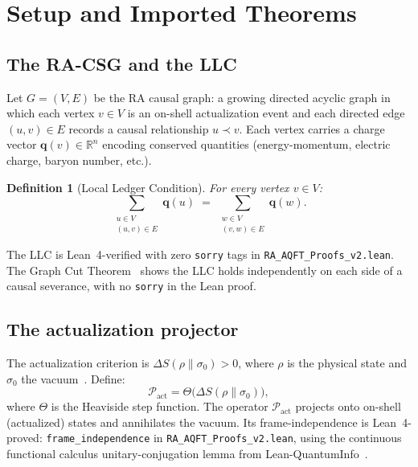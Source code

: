 \documentclass[11pt,a4paper]{article}
\newtheorem{definition}[theorem]{Definition}
\newcommand{\Pact}{\mathcal{P}_{\mathrm{act}}}
\newcommand{\dS}{\Delta S}
\begin{document}
\section{Setup and Imported Theorems}
\label{sec:setup}

\subsection{The RA-CSG and the LLC}

Let $G = (V, E)$ be the RA causal graph: a growing directed acyclic
graph in which each vertex $v \in V$ is an on-shell actualization
event and each directed edge $(u,v) \in E$ records a causal
relationship $u \prec v$. Each vertex carries a charge vector
$\mathbf{q}(v) \in \mathbb{R}^n$ encoding conserved quantities
(energy-momentum, electric charge, baryon number, etc.).

\begin{definition}[Local Ledger Condition]
\label{def:LLC}
For every vertex $v \in V$:
\begin{equation}
  \sum_{\substack{u \in V \\ (u,v)\in E}} \mathbf{q}(u)
  \;=\;
  \sum_{\substack{w \in V \\ (v,w)\in E}} \mathbf{q}(w).
\end{equation}
\end{definition}

\noindent
The LLC is Lean~4-verified with zero \texttt{sorry} tags in
\texttt{RA\_AQFT\_Proofs\_v2.lean}. The Graph Cut
Theorem~\citep{Sandeman2026RAGC} shows the LLC holds independently on
each side of a causal severance, with no \texttt{sorry} in the Lean
proof.

\subsection{The actualization projector}

The actualization criterion is $\dS(\rho\|\sigma_0) > 0$, where
$\rho$ is the physical state and $\sigma_0$ the vacuum~\citep{Sandeman2026RAQM}.
Define:
\begin{equation}
  \Pact = \Theta\!\bigl(\dS(\rho\|\sigma_0)\bigr),
\end{equation}
where $\Theta$ is the Heaviside step function. The operator $\Pact$
projects onto on-shell (actualized) states and annihilates the vacuum.
Its frame-independence is Lean~4-proved:
\texttt{frame\_independence} in \texttt{RA\_AQFT\_Proofs\_v2.lean},
using the continuous functional calculus unitary-conjugation lemma
from Lean-QuantumInfo~\citep{Meiburg2025LQI}.
\end{document}
